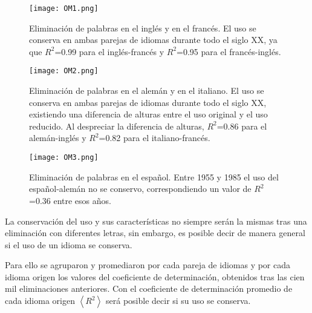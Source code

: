



\begin{figure}[h!]
	\centering
	\texttt{[image: OM1.png]}
	\caption{Eliminación de palabras en el inglés y en el francés. El uso se conserva en ambas parejas de idiomas durante todo el siglo XX, ya que $R^{2}$=0.99 para el inglés-francés y $R^{2}$=0.95 para el francés-inglés.}
	\label{fig.OM1}
\end{figure}


\begin{figure}[h!]
	\centering
	\texttt{[image: OM2.png]}
	\caption{Eliminación de palabras en el alemán y en el italiano. El uso se conserva en ambas parejas de idiomas durante todo el siglo XX, existiendo una diferencia de alturas entre el uso original y el uso reducido.  Al despreciar la diferencia de alturas, $R^{2}$=0.86 para el alemán-inglés y $R^{2}$=0.82 para el italiano-francés.}
	\label{fig.OM2}
\end{figure}



\begin{figure}[h!]
	\centering
	\texttt{[image: OM3.png]}
	\caption{Eliminación de palabras en el español. Entre 1955 y 1985 el uso del español-alemán no se conservo, correspondiendo un valor de $R^{2}$=0.36 entre esos años.}
	\label{fig.OM3}
\end{figure}


La conservación del uso y sus características no siempre serán la mismas tras una eliminación con diferentes letras, sin embargo, es posible decir de manera general si el uso de un idioma se conserva. 

Para ello se agruparon y promediaron por cada pareja de idiomas y por cada idioma origen los valores del coeficiente de determinación, obtenidos tras las cien mil eliminaciones anteriores. Con el coeficiente de determinación promedio de cada idioma origen $\left \langle R^{2}  \right \rangle$ será posible decir si su uso se conserva.

